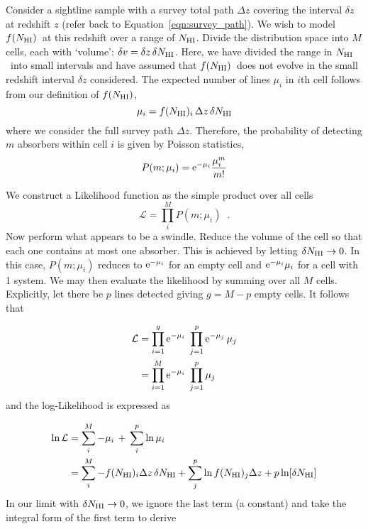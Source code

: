 \documentclass[graybox]{svmult}
\def\smm{\sum\limits}
\newcommand{\mnhi}{N_{\rm HI}}
\newcommand{\nhi}{$\mnhi$}
\def\mfnhi{f(\mnhi)}
\def\fnhi{$\mfnhi$}
\def\prodl{\prod\limits}
\begin{document}
Consider a sightline sample with a survey total path $\Delta z$ 
covering the interval $\delta z$ at redshift $z$ (refer
back to Equation~\ref{eqn:survey_path}).
We wish to model \fnhi\ at this redshift over a
range of \nhi.  
Divide the distribution space into $M$ cells, each with 
`volume': $\delta v = \delta z \, \delta \mnhi$.
Here, we have divided the range in \nhi\ into small intervals
and have assumed that \fnhi\ does not evolve in the small
redshift interval $\delta z$ considered.
The expected number of lines $\mu_i$ in $i$th cell
follows from our definition of \fnhi, 
\begin{equation}
\mu_i = f(\mnhi)_i \, \Delta z \, \delta\mnhi
\end{equation}
where we consider the full survey path $\Delta z$.
Therefore, the probability of detecting $m$ absorbers within 
cell $i$ is given by Poisson statistics,
\begin{equation}
P(m; \mu_i) = {\rm e}^{-\mu_i} \frac{\mu_i^m}{m!}
\end{equation}

We construct a Likelihood function as the 
simple product over all cells
\begin{equation}
\mathcal{L} = \prodl_i^M P(m; \mu_i) \;\; .
\end{equation}
Now perform what appears to be a swindle.
Reduce the volume of the cell so that each one contains
at most one absorber.  This is achieved by letting
$\delta\mnhi \to 0$.
In this case, $P(m;\mu_i)$ reduces to ${\rm e}^{-\mu_i}$ for an
empty cell and ${\rm e}^{-\mu_i} \mu_i$ for a cell with 1 system.
We may then evaluate the likelihood
by summing over all $M$ cells.  Explicitly,  
let there be $p$ lines detected giving $g=M-p$ empty cells.
It follows that 

\begin{align}
\mathcal{L} &= \prodl_{i=1}^g {\rm e}^{-\mu_i} \;
\prodl_{j=1}^p {\rm e}^{-\mu_j} \, \mu_j \\
&= \prodl_{i=1}^M {\rm e}^{-\mu_i} \; \prodl_{j=1}^p \mu_j
\end{align}
and the log-Likelihood is expressed as

\begin{align}
\ln \mathcal{L} &= \smm_i^M -\mu_i \, + \, \smm_i^p \ln \mu_i \\
&= \smm_i^M -f(\mnhi)_i \Delta z \, \delta\mnhi +
\smm_j^p \ln f(\mnhi)_j \Delta z + p \ln [\delta\mnhi]
\label{eqn:max_fN}
\end{align}
In our limit with $\delta\mnhi \to 0$,
we ignore the last term (a constant) and take the integral form
of the first term to derive
\end{document}

